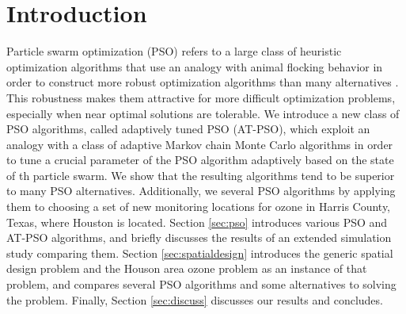 \documentclass[12pt]{article}
\begin{document}
\section{Introduction}
Particle swarm optimization (PSO) refers to a large class of heuristic optimization algorithms that use an analogy with animal flocking behavior in order to construct more robust optimization algorithms than many alternatives \citep{clerc2002particle,blum2008swarm,clerc2010particle}. This robustness makes them attractive for more difficult optimization problems, especially when near optimal solutions are tolerable. We introduce a new class of PSO algorithms, called adaptively tuned PSO (AT-PSO), which exploit an analogy with a class of adaptive Markov chain Monte Carlo algorithms in order to tune a crucial parameter of the PSO algorithm adaptively based on the state of th particle swarm. We show that the resulting algorithms tend to be superior to many PSO alternatives. Additionally, we several PSO algorithms by applying them to choosing a set of new monitoring locations for ozone in Harris County, Texas, where Houston is located. Section \ref{sec:pso} introduces various PSO and AT-PSO algorithms, and briefly discusses the results of an extended simulation study comparing them. Section \ref{sec:spatialdesign} introduces the generic spatial design problem and the Houson area ozone problem as an instance of that problem, and compares several PSO algorithms and some alternatives to solving the problem. Finally, Section \ref{sec:discuss} discusses our results and concludes.
\end{document}
